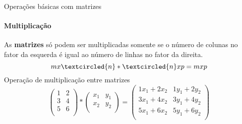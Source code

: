 \begin{frame}[t]{Operações básicas com matrizes} 
    \framesubtitle{Multiplicação}

    As \textbf{matrizes} só podem ser multiplicadas somente se o número de colunas no fator da esquerda é igual ao número de linhas no fator da direita. \\
    \begin{equation}
        m x \textcircled{n} * \textcircled{n} x p = m x p
    \end{equation}
    \vspace*{0.3cm}
    Operação de multiplicação entre matrizes
    \begin{equation}
        \begin{pmatrix}
            1 & 2 \\
            3 & 4 \\
            5 & 6 \\
        \end{pmatrix}
        *
        \begin{pmatrix}
            x_1 & y_1 \\
            x_2 & y_2 \\
        \end{pmatrix}
        =
        \begin{pmatrix}
            1x_1 + 2x_2  & 1y_1 + 2y_2  \\
            3x_1 + 4x_2  & 3y_1 + 4y_2  \\
            5x_1 + 6x_2  & 5y_1 + 6y_2  \\
        \end{pmatrix}
    \end{equation}
    \vspace*{0.3cm}
\end{frame}
